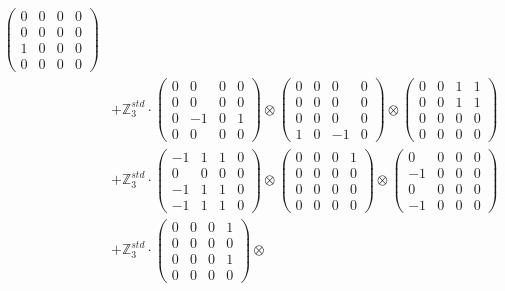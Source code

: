 \documentclass{article}
\begin{document}
{\begin{align}
            \begin{pmatrix} 0 & 0 & 0 & 0 \\ 0 & 0 & 0 & 0 \\ 1 & 0 & 0 & 0 \\ 0 & 0 & 0 & 0 \end{pmatrix} \\ 
        &+ \label{Rs16-Rc11-Solution-14-c25} \mathbb{Z}_3^{std} \cdot 
            \begin{pmatrix} 0 & 0 & 0 & 0 \\ 0 & 0 & 0 & 0 \\ 0 & -1 & 0 & 1 \\ 0 & 0 & 0 & 0 \end{pmatrix} \otimes 
            \begin{pmatrix} 0 & 0 & 0 & 0 \\ 0 & 0 & 0 & 0 \\ 0 & 0 & 0 & 0 \\ 1 & 0 & -1 & 0 \end{pmatrix} \otimes 
            \begin{pmatrix} 0 & 0 & 1 & 1 \\ 0 & 0 & 1 & 1 \\ 0 & 0 & 0 & 0 \\ 0 & 0 & 0 & 0 \end{pmatrix} \\ 
        &+ \label{Rs16-Rc11-Solution-14-c26} \mathbb{Z}_3^{std} \cdot 
            \begin{pmatrix} -1 & 1 & 1 & 0 \\ 0 & 0 & 0 & 0 \\ -1 & 1 & 1 & 0 \\ -1 & 1 & 1 & 0 \end{pmatrix} \otimes 
            \begin{pmatrix} 0 & 0 & 0 & 1 \\ 0 & 0 & 0 & 0 \\ 0 & 0 & 0 & 0 \\ 0 & 0 & 0 & 0 \end{pmatrix} \otimes 
            \begin{pmatrix} 0 & 0 & 0 & 0 \\ -1 & 0 & 0 & 0 \\ 0 & 0 & 0 & 0 \\ -1 & 0 & 0 & 0 \end{pmatrix} \\ 
        &+ \label{Rs16-Rc11-Solution-14-c27} \mathbb{Z}_3^{std} \cdot 
            \begin{pmatrix} 0 & 0 & 0 & 1 \\ 0 & 0 & 0 & 0 \\ 0 & 0 & 0 & 1 \\ 0 & 0 & 0 & 0 \end{pmatrix} \otimes 

\end{align}}
\end{document}
